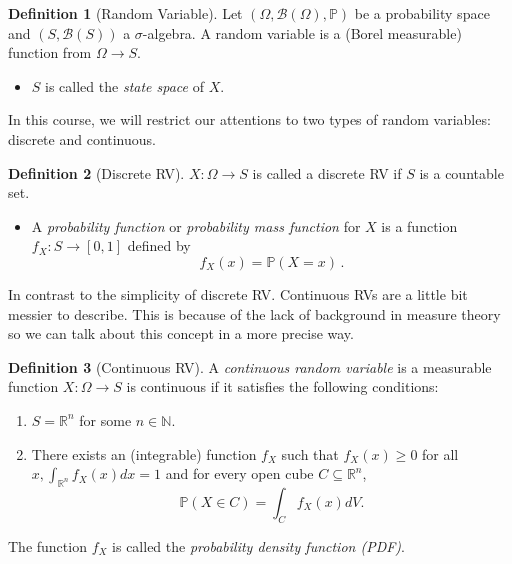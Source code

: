 \documentclass[
  openany]{book}
\providecommand{\tightlist}{%
  \setlength{\itemsep}{0pt}\setlength{\parskip}{0pt}}
\theoremstyle{definition}
\newtheorem{definition}{Definition}[chapter]
\theoremstyle{definition}
\theoremstyle{definition}
\theoremstyle{definition}
\theoremstyle{remark}
\begin{document}
\begin{definition}[Random Variable]

Let \((\Omega, \mathcal{B}(\Omega), \mathbb{P})\) be a probability space and \((S, \mathcal{B}(S))\) a \(\sigma\)-algebra.
A random variable is a (Borel measurable) function from \(\Omega \to S\).

\begin{itemize}
\tightlist
\item
  \(S\) is called the \emph{state space} of \(X\).
\end{itemize}

\end{definition}

In this course, we will restrict our attentions to two types of random variables: discrete and continuous.

\begin{definition}[Discrete RV]

\(X: \Omega \to S\) is called
a discrete RV if \(S\) is a countable set.

\begin{itemize}
\tightlist
\item
  A \emph{probability function} or \emph{probability mass function} for \(X\) is a function
  \(f_X: S \to [0,1]\) defined by
  \[ f_X(x) = \mathbb{P}(X = x) \,. \]
\end{itemize}

\end{definition}

In contrast to the simplicity of discrete RV. Continuous RVs are a little bit messier to describe.
This is because of the lack of background in measure theory so we can talk about this concept in
a more precise way.

\begin{definition}[Continuous RV]
A \emph{continuous random variable} is a measurable function \(X:\Omega \to S\) is continuous
if it satisfies the following conditions:

\begin{enumerate}
\def\labelenumi{\arabic{enumi}.}
\item
  \(S = \mathbb{R}^n\) for some \(n\in \mathbb{N}\).
\item
  There exists an (integrable) function \(f_X\) such that \(f_X(x) \geq 0\)
  for all \(x, \int_{\mathbb{R}^n} f_X(x) d x=1\) and for every open cube \(C \subseteq \mathbb{R}^n\),
  \[
  \mathbb{P}(X\in C)=\int_C f_X(x) dV .
  \]
\end{enumerate}

The function \(f_X\) is called the \emph{probability density function (PDF)}.
\end{definition}
\end{document}
